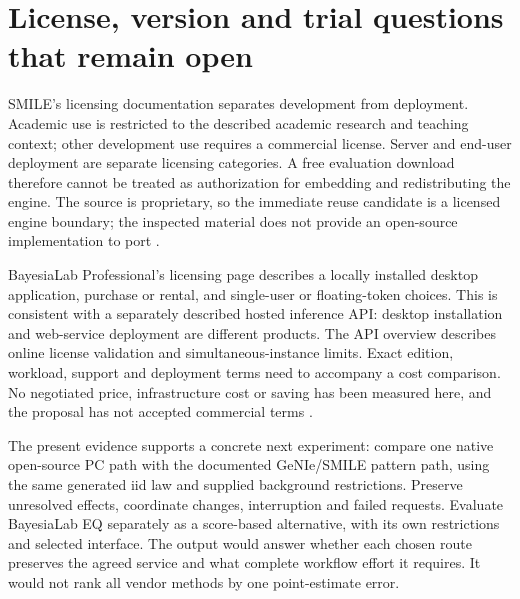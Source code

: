 \section{License, version and trial questions that remain open}

SMILE's licensing documentation separates development from deployment.
Academic use is restricted to the described academic research and teaching
context; other development use requires a commercial license. Server and
end-user deployment are separate licensing categories. A free evaluation
download therefore cannot be treated as authorization for embedding and
redistributing the engine. The source is proprietary, so the immediate reuse
candidate is a licensed engine boundary; the inspected material does not
provide an open-source implementation to port
\citep{exec13_smile_license}.

BayesiaLab Professional's licensing page describes a locally installed desktop
application, purchase or rental, and single-user or floating-token choices.
This is consistent with a separately described hosted inference API: desktop
installation and web-service deployment are different products. The API
overview describes online license validation and simultaneous-instance limits.
Exact edition, workload, support and deployment terms need to accompany a
cost comparison. No negotiated price, infrastructure cost or saving has been
measured here, and the proposal has not accepted commercial terms
\citep{exec13_bayesia_professional,exec13_bayesia_api}.

The present evidence supports a concrete next experiment: compare one
native open-source PC path with the documented GeNIe/SMILE pattern path,
using the same generated iid law and supplied background restrictions.
Preserve unresolved effects, coordinate changes, interruption and failed
requests. Evaluate BayesiaLab EQ separately as a score-based alternative,
with its own restrictions and selected interface. The output would answer
whether each chosen route preserves the agreed service and what complete
workflow effort it requires. It would not rank all vendor methods by one
point-estimate error.

